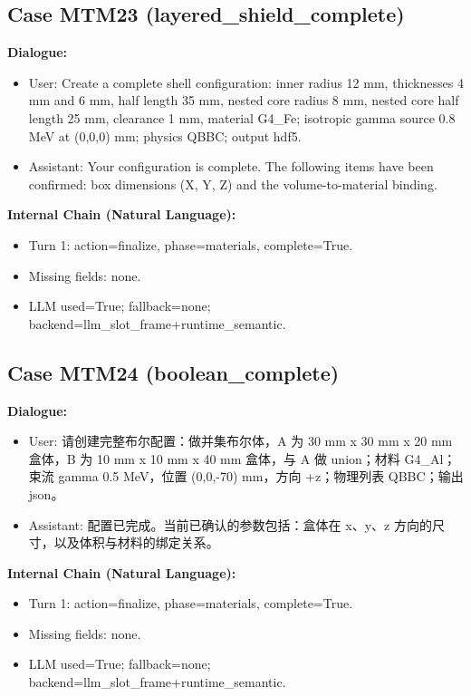 \documentclass[11pt]{ctexart}
\begin{document}
\subsection{Case MTM23 (layered\_shield\_complete)}
\textbf{Dialogue:}
\begin{itemize}
\item User: Create a complete shell configuration: inner radius 12 mm, thicknesses 4 mm and 6 mm, half length 35 mm, nested core radius 8 mm, nested core half length 25 mm, clearance 1 mm, material G4\_Fe; isotropic gamma source 0.8 MeV at (0,0,0) mm; physics QBBC; output hdf5.
\item Assistant: Your configuration is complete. The following items have been confirmed: box dimensions (X, Y, Z) and the volume-to-material binding.
\end{itemize}
\textbf{Internal Chain (Natural Language):}
\begin{itemize}
\item Turn 1: action=finalize, phase=materials, complete=True.
\item Missing fields: none.
\item LLM used=True; fallback=none; backend=llm\_slot\_frame+runtime\_semantic.
\end{itemize}
\subsection{Case MTM24 (boolean\_complete)}
\textbf{Dialogue:}
\begin{itemize}
\item User: 请创建完整布尔配置：做并集布尔体，A 为 30 mm x 30 mm x 20 mm 盒体，B 为 10 mm x 10 mm x 40 mm 盒体，与 A 做 union；材料 G4\_Al；束流 gamma 0.5 MeV，位置 (0,0,-70) mm，方向 +z；物理列表 QBBC；输出 json。
\item Assistant: 配置已完成。当前已确认的参数包括：盒体在 x、y、z 方向的尺寸，以及体积与材料的绑定关系。
\end{itemize}
\textbf{Internal Chain (Natural Language):}
\begin{itemize}
\item Turn 1: action=finalize, phase=materials, complete=True.
\item Missing fields: none.
\item LLM used=True; fallback=none; backend=llm\_slot\_frame+runtime\_semantic.
\end{itemize}
\end{document}
